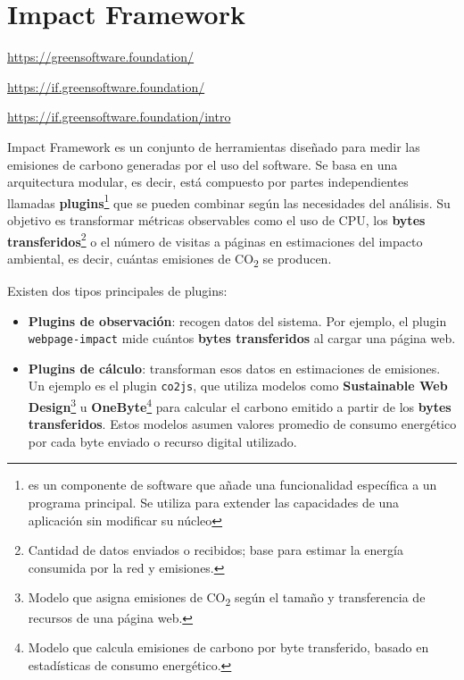 \documentclass[12pt,a4paper]{report}
\begin{document}
\section*{Impact Framework}

\href{https://greensoftware.foundation/}{https://greensoftware.foundation/}

\href{https://if.greensoftware.foundation/}{https://if.greensoftware.foundation/}

\href{https://if.greensoftware.foundation/intro}{https://if.greensoftware.foundation/intro}

Impact Framework es un conjunto de herramientas diseñado para medir las
emisiones de carbono generadas por el uso del software. Se basa en una
arquitectura modular, es decir, está compuesto por partes independientes
llamadas \textbf{plugins}\footnote{es un componente de software que añade una funcionalidad específica a un programa principal. Se utiliza para extender las capacidades de una aplicación sin modificar su núcleo} que se pueden combinar según las necesidades del análisis. Su
objetivo es transformar métricas observables como el uso de CPU, los
\textbf{bytes transferidos}\footnote{Cantidad de datos enviados o recibidos;
  base para estimar la energía consumida por la red y emisiones.} o el número de
visitas a páginas en estimaciones del impacto ambiental, es decir, cuántas
emisiones de CO\textsubscript{2} se producen.

Existen dos tipos principales de plugins:

\begin{itemize}
  \item \textbf{Plugins de observación}: recogen datos del sistema. Por ejemplo, el plugin \texttt{webpage-impact} mide cuántos \textbf{bytes transferidos} al cargar una página web.
  \item \textbf{Plugins de cálculo}: transforman esos datos en estimaciones de emisiones. Un ejemplo es el plugin \texttt{co2js}, que utiliza modelos como \textbf{Sustainable Web Design}\footnote{Modelo que asigna emisiones de CO\textsubscript{2} según el tamaño y transferencia de recursos de una página web.} u \textbf{OneByte}\footnote{Modelo que calcula emisiones de carbono por byte transferido, basado en estadísticas de consumo energético.} para calcular el carbono emitido a partir de los \textbf{bytes transferidos}. Estos modelos asumen valores promedio de consumo energético por cada byte enviado o recurso digital utilizado.
\end{itemize}
\end{document}

